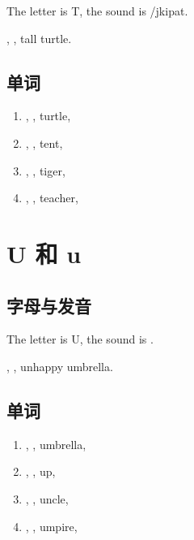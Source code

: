 The letter is T, the sound is /jkipa{t}.

, , tall turtle.

\subsection{单词}

\begin{enumerate}
  \item {}, , turtle, 
  \item {}, , tent, 
  \item {}, , tiger, 
  \item {}, , teacher, 
\end{enumerate}



\section{U 和 u}

\subsection{字母与发音}

The letter is U, the sound is \jkipa{\textturnv}.

\jkipa{\textturnv}, \jkipa{\textturnv}, unhappy umbrella.

\subsection{单词}

\begin{enumerate}
  \item \jkipa{\textturnv}, \jkipa{\textturnv}, umbrella, 
  \item \jkipa{\textturnv}, \jkipa{\textturnv}, up, 
  \item \jkipa{\textturnv}, \jkipa{\textturnv}, uncle, 
  \item \jkipa{\textturnv}, \jkipa{\textturnv}, umpire, 
\end{enumerate}

